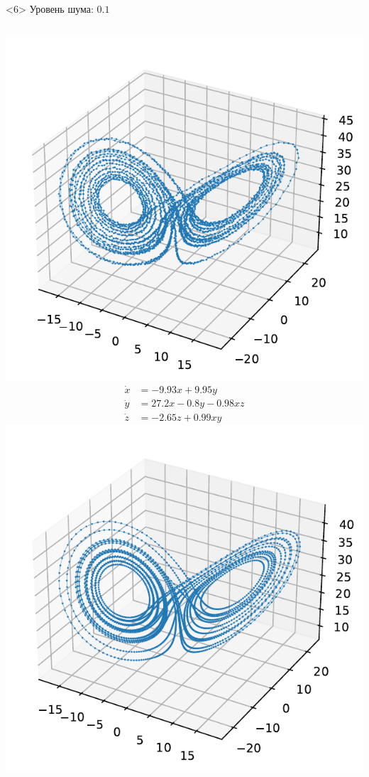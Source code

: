 \documentclass[pdf, hyperref={unicode}, aspectratio=169]{beamer}
\begin{document}
\begin{frame}
\begin{onlyenv}<6>
Уровень шума: $0.1$
\vfill
\begin{columns}
  \includegraphics[height=\linewidth]{img/ex3_orig}
  \begin{align*}
  \dot{x} &= -9.93 x + 9.95 y \\
  \dot{y} &= 27.2 x - 0.8 y - 0.98 x z \\
  \dot{z} &= -2.65 z + 0.99 x y
  \end{align*}
  \includegraphics[height=\linewidth]{img/ex3_res}

\end{columns}
\end{onlyenv}
\end{frame}
\end{document}
